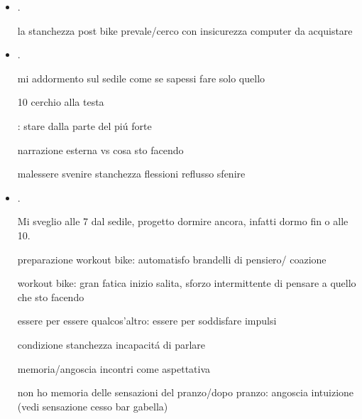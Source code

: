 \begin{itemize}
mi sono addormentato sul sedile

Mangio banana/cioccolata/provo workout

MI VIENE IN MENTE CHE. ho un modo di pensare a regioni

workout trazioni diventa fium,e ilare: come la musica trasformava la mia percezione dei luoghi.

il cambio d'umore innescato dalle due troiette che se ne vanno mi ricorda che non sono abituato a considerare la realt\'a

\item {}.

la stanchezza post bike prevale/cerco con insicurezza computer da acquistare

\item {}.

mi addormento sul sedile come se sapessi fare solo quello

10 cerchio alla testa


: stare dalla parte del pi\'u forte

narrazione esterna vs cosa sto facendo

malessere svenire stanchezza flessioni reflusso sfenire


\item {}.

Mi sveglio alle 7 dal sedile, progetto dormire ancora, infatti dormo fin o alle 10.

preparazione workout bike: automatisfo brandelli di pensiero/ coazione

workout bike: gran fatica inizio salita, sforzo intermittente di pensare a quello che sto facendo

essere per essere qualcos'altro: essere per soddisfare impulsi

condizione stanchezza incapacit\'a di parlare


memoria/angoscia incontri come aspettativa

non ho memoria delle sensazioni del pranzo/dopo pranzo: angoscia intuizione (vedi sensazione cesso bar gabella)


\end{itemize}
